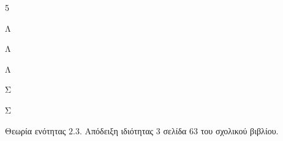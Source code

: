 
\begin{alist}
\item
\begin{multicols}{5}
\begin{rlist}
\item Λ
\item Λ
\item Λ
\item Σ
\item Σ
\end{rlist}
\end{multicols}
\item Θεωρία ενότητας $2.3$. Απόδειξη ιδιότητας 3 σελίδα 63 του σχολικού βιβλίου.
\end{alist}

